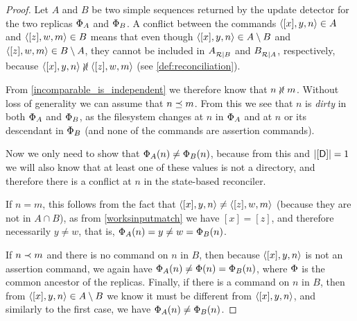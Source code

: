 \begin{proof}
Let $A$ and $B$ be two simple sequences returned by the update detector
for the two replicas $\Phi_A$ and $\Phi_B$.
A conflict between the commands $\langle{[x],y,n}\rangle\in A$ and $\langle{[z],w,m}\rangle\in B$
means that even though $\langle{[x],y,n}\rangle\in A\setminus B$
and $\langle{[z],w,m}\rangle\in B\setminus A$, they cannot be included in
${A}^{}_{\mathcal{R}|{B}}$ and ${B}^{}_{\mathcal{R}|{A}}$, respectively, because
$\cxynv\nindep\czwmv$ (see \cref{def:reconciliation}).

From \cref{incomparable_is_independent} we therefore know that $n\nunrel m$.
Without loss of generality we can assume that $n\preceq m$.
From this we see that $n$ is \emph{dirty} in both $\Phi_A$ and $\Phi_B$,
as the filesystem changes at $n$ in $\Phi_A$ and at $n$ or its descendant in $\Phi_B$
(and none of the commands are assertion commands).

Now we only need to show that $\Phi_A(n)\neq\Phi_B(n)$, because from this 
and $|[\mathsf{D}]|=1$ we will also
know that at least one of these values is not a directory,
and therefore there is a conflict at $n$ in the state-based reconciler.

If $n=m$, this follows from the fact that $\langle{[x],y,n}\rangle\neq\langle{[z],w,m}\rangle$ 
(because they are not in $A\cap B$),
as from \cref{worksinputmatch} we have $[x]=[z]$,
and therefore necessarily $y\neq w$,
that is, $\Phi_A(n)=y\neq w=\Phi_B(n)$.

If $n\prec m$ and there is no command on $n$ in $B$, then 
because $\langle{[x],y,n}\rangle$ is not an assertion command, we again have
$\Phi_A(n)\neq\Phi(n)=\Phi_B(n)$, where $\Phi$ is the common ancestor of the replicas.
Finally, if there is a command on $n$ in $B$, then 
from $\langle{[x],y,n}\rangle\in A\setminus B$ we know
it must be different from $\langle{[x],y,n}\rangle$, and similarly to the first case,
we have $\Phi_A(n)\neq\Phi_B(n)$.
\end{proof}

